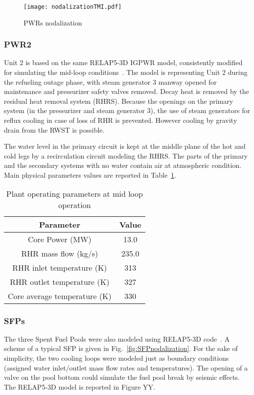 \begin{figure}
    \centering
    \texttt{[image: nodalizationTMI.pdf]}
    \caption{PWRs nodalization}
    \label{fig:PWRnodalization}
\end{figure}

\subsubsection{PWR2}
Unit 2 is based on the same RELAP5-3D IGPWR model, consistently modified for simulating the 
mid-loop conditions~\cite{NUREGCR6144}. The model is representing Unit 2 
during the refueling outage phase, with steam generator 3 manway opened for maintenance and pressurizer safety 
valves removed. Decay heat is removed by the residual heat removal system (RHRS). Because the 
openings on the primary system (in the pressurizer and steam generator 3), the use of steam generators 
for reflux cooling in case 
of loss of RHR is prevented. However cooling by gravity drain from the RWST is possible.

The water level in the primary circuit is kept at the middle plane of the hot and cold legs 
by a recirculation circuit modeling the RHRS. 
The parts of the primary and the secondary systems with no water contain air at atmospheric condition.  
Main physical parameters values are reported in Table~\ref{tab:midLoopParamteres}.

\begin{table}
  \begin{tabular}{|c|c|}
     \hline
     \textbf{Parameter}           & \textbf{Value}   \\ \hline \hline
     Core Power (MW)              & 13.0    \\ \hline
     RHR mass flow (kg/s)         & 235.0   \\ \hline
     RHR inlet temperature (K)    & 313     \\ \hline
     RHR outlet temperature (K)   & 327     \\ \hline
     Core average temperature (K) & 330     \\ \hline
  \end{tabular}
  \caption{Plant operating parameters at mid loop operation}
  \label{tab:midLoopParamteres}
\end{table} 

\subsubsection{SFPs}
The three Spent Fuel Pools were also modeled using RELAP5-3D code~\cite{parisiExternalAnalysis}. 
A scheme of a typical SFP is given in Fig.~\ref{fig:SFPnodalization}. 
For the sake of simplicity, the two cooling loops were modeled just as boundary conditions 
(assigned water inlet/outlet mass flow rates and temperatures). The opening of a valve on the pool bottom
could simulate the fuel pool break by seismic effects. The RELAP5-3D model is reported in Figure YY.


